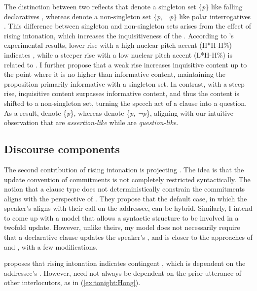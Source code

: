 \documentclass[output=paper,colorlinks,citecolor=brown]{langscibook}
\begin{document}
The distinction between two  reflects that  denote a singleton set \{\textit{p}\} like falling declaratives \citep{hamblin1971mathematical}, whereas  denote a non-singleton set \{\textit{p}, \textit{¬p}\} like polar interrogatives \citep{karttunen1977syntax}. This difference between singleton and non-singleton sets arises from the effect of rising intonation, which increases the inquisitiveness of the . According to \citet{jeong2018intonation}'s experimental results, lower rise with a high nuclear pitch accent (H*H-H\%) indicates , while a steeper rise with a low nuclear pitch accent (L*H-H\%) is related to . I further propose that a weak rise increases inquisitive content up to the point where it is no higher than informative content, maintaining the proposition primarily informative with a singleton set. In contrast, with a steep rise, inquisitive content surpasses informative content, and thus the content is shifted to a non-singleton set, turning the speech act of a clause into a question. As a result,  denote \{\textit{p}\}, whereas  denote \{\textit{p}, \textit{¬p}\}, aligning with our intuitive observation that  are \textit{assertion-like} while  are \textit{question-like}.

\subsection{Discourse components}
\label{sec: discomp:Hong}

The second contribution of rising intonation is projecting . The idea is that the update convention of commitments is not completely restricted syntactically. The notion that a clause type does not deterministically constrain the commitments aligns with the perspective of \citet{beyssade2006speech}. They propose that the default case, in which the speaker's  aligns with their call on the addressee, can be hybrid. Similarly, I intend to come up with a model that allows a syntactic structure to be involved in a twofold update. However, unlike theirs, my model does not necessarily require that a declarative clause updates the speaker’s , and is closer to the approaches of \citet{gunlogson2008question} and \citet{rudin2018rising, rudin2022intonational}, with a few modifications.

\citet{gunlogson2008question} proposes that rising intonation indicates contingent , which is dependent on the addressee’s . However,  need not always be dependent on the prior utterance of other interlocutors, as in (\ref{ex:tonight:Hong}).
\end{document}
